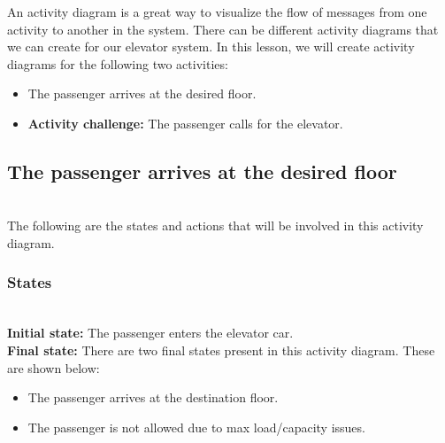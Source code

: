 

An activity diagram is a great way to visualize the flow of messages from one activity to another in the system. There can be different activity diagrams that we can create for our elevator system. In this lesson, we will create activity diagrams for the following two activities:

\begin{itemize}
\item
\protect{}\label{pH8RKZFsThP7y8zfrPo0C}
The passenger arrives at the desired floor.
\item
\protect{}\label{r56wM3OHLjthWutL3O5CJ}
\textbf{Activity challenge:} The passenger calls for the elevator.
\end{itemize}

\subsection{The passenger arrives at the desired floor}\label{OTOyJ6rT_pOQBegLwU4as}
\\
The following are the states and actions that will be involved in this activity diagram.

\subsubsection{States}\label{0mbDpwXhm2w4q8AoSWY_O}
\\
\textbf{Initial state:} The passenger enters the elevator car.
\\
\textbf{Final state:} There are two final states present in this activity diagram. These are shown below:

\begin{itemize}
\item
\protect{}\label{HPMCYACBp6ZvNgpUg5GG9}
The passenger arrives at the destination floor.
\item
\protect{}\label{-VZrMMApRwtaJ54YG-Cuq}
The passenger is not allowed due to max load/capacity issues.
\end{itemize}

